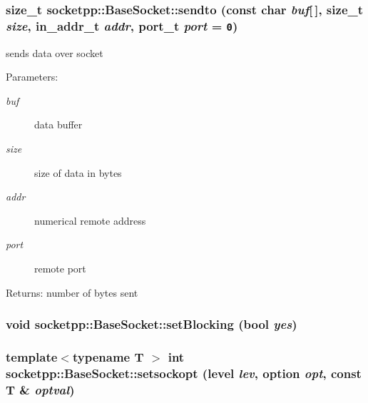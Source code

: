 \begin{CompactItemize}
{\subsubsection[{sendto}]{\setlength{\rightskip}{0pt plus 5cm}size\_\-t socketpp::BaseSocket::sendto (const char {\em buf}\mbox{[}$\,$\mbox{]}, \/  size\_\-t {\em size}, \/  in\_\-addr\_\-t {\em addr}, \/  {\bf port\_\-t} {\em port} = {\tt 0})}}
\label{classsocketpp_1_1BaseSocket_33ef257bb6eb0f23ae0680df57738f3a}


sends data over socket 

\begin{Desc}
\item[Parameters:]
\begin{description}
\item[{\em buf}]data buffer \item[{\em size}]size of data in bytes \item[{\em addr}]numerical remote address \item[{\em port}]remote port \end{description}
\end{Desc}
\begin{Desc}
\item[Returns:]number of bytes sent \end{Desc}
\hypertarget{classsocketpp_1_1BaseSocket_4cffcd5cae4ef51e953495837fade4c3}{
\subsubsection[{setBlocking}]{\setlength{\rightskip}{0pt plus 5cm}void socketpp::BaseSocket::setBlocking (bool {\em yes})}}
\label{classsocketpp_1_1BaseSocket_4cffcd5cae4ef51e953495837fade4c3}


\hypertarget{classsocketpp_1_1BaseSocket_3f1f168e4953c046bb1159941da2fa30}{
\subsubsection[{setsockopt}]{\setlength{\rightskip}{0pt plus 5cm}template$<$typename T $>$ int socketpp::BaseSocket::setsockopt ({\bf level} {\em lev}, \/  {\bf option} {\em opt}, \/  const T \& {\em optval})}}
\label{classsocketpp_1_1BaseSocket_3f1f168e4953c046bb1159941da2fa30}



\end{CompactItemize}
